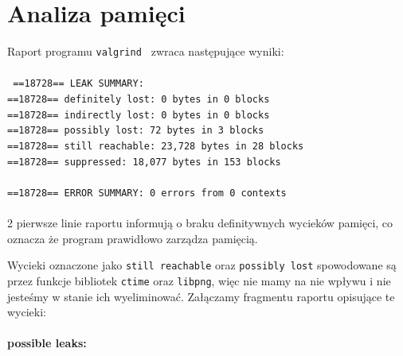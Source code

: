 \documentclass{mwart}
\begin{document}
\section{Analiza pamięci}
\noindent Raport programu \texttt{valgrind } zwraca następujące wyniki:\\\\
\noindent \texttt{\noindent 
==18728== LEAK SUMMARY:\\
==18728==    definitely lost: 0 bytes in 0 blocks\\
==18728==    indirectly lost: 0 bytes in 0 blocks\\
==18728==      possibly lost: 72 bytes in 3 blocks\\
==18728==    still reachable: 23,728 bytes in 28 blocks\\
==18728==         suppressed: 18,077 bytes in 153 blocks\\
\\
==18728== ERROR SUMMARY: 0 errors from 0 contexts 
}\\\\

2 pierwsze linie raportu informują o braku definitywnych wycieków pamięci, co oznacza że program prawidłowo zarządza pamięcią.

Wycieki oznaczone jako \texttt{still reachable} oraz \texttt{possibly lost} spowodowane są przez funkcje bibliotek \texttt{ctime} oraz \texttt{libpng}, więc nie mamy na nie wpływu i nie jesteśmy w stanie ich wyeliminować. Załączamy fragmentu raportu opisujące te wycieki:\\

\paragraph{possible leaks:} \mbox{}
\end{document}
